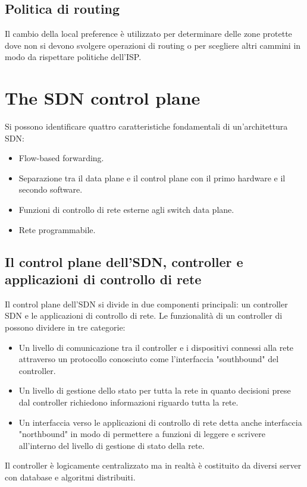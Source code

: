 \subsection{Politica di routing}
Il cambio della local preference \`e utilizzato per determinare delle zone protette dove non si devono svolgere operazioni di routing o per scegliere altri
cammini in modo da rispettare politiche dell'ISP. 
\section{The SDN control plane}
Si possono identificare quattro caratteristiche fondamentali di un'architettura SDN:
\begin{itemize}
\item Flow-based forwarding.
\item Separazione tra il data plane e il control plane con il primo hardware e il secondo software.
\item Funzioni di controllo di rete esterne agli switch data plane.
\item Rete programmabile. 
\end{itemize}
\subsection{Il control plane dell'SDN, controller e applicazioni di controllo di rete}
Il control plane dell'SDN si divide in due componenti principali: un controller SDN e le applicazioni di controllo di rete. Le funzionalit\`a di un 
controller di possono dividere in tre categorie:
\begin{itemize}
\item Un livello di comunicazione tra il controller e i dispositivi connessi alla rete attraverso un protocollo conosciuto come l'interfaccia "southbound"
del controller.
\item Un livello di gestione dello stato per tutta la rete in quanto decisioni prese dal controller richiedono informazioni riguardo tutta la rete. 
\item Un interfaccia verso le applicazioni di controllo di rete detta anche interfaccia "northbound" in modo di permettere a funzioni di leggere e scrivere
all'interno del livello di gestione di stato della rete. 
\end{itemize}
Il controller \`e logicamente centralizzato ma in realt\`a \`e costituito da diversi server con database e algoritmi distribuiti. 
